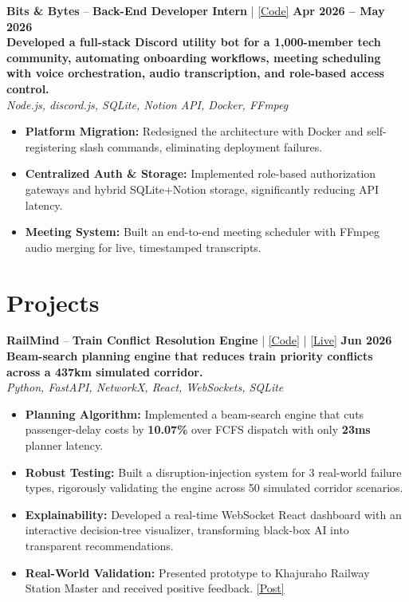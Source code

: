 \documentclass[a4paper,9pt]{extarticle}
\newenvironment{cvlist}{%
  \begin{itemize}[nosep, leftmargin=1.2em, itemsep=0.5pt, topsep=1pt, label=\textbullet, after=\vspace{2pt}]
}{%
  \end{itemize}
}
\begin{document}
\noindent\textbf{Bits \& Bytes} -- \textbf{Back-End Developer Intern} | \href{https://github.com/Prakharrdev/bitsnbytes-discord-utility}{\small [Code]} \hfill \textbf{Apr 2026 -- May 2026}\\[1pt]
\textbf{Developed a full-stack Discord utility bot for a 1,000-member tech community, automating onboarding workflows, meeting scheduling with voice orchestration, audio transcription, and role-based access control.}\\[1pt]\noindent\textit{Node.js, discord.js, SQLite, Notion API, Docker, FFmpeg}
\begin{cvlist}
  \item \textbf{Platform Migration:} Redesigned the architecture with Docker and self-registering slash commands, eliminating deployment failures.
  \item \textbf{Centralized Auth \& Storage:} Implemented role-based authorization gateways and hybrid SQLite+Notion storage, significantly reducing API latency.
  \item \textbf{Meeting System:} Built an end-to-end meeting scheduler with FFmpeg audio merging for live, timestamped transcripts.
\end{cvlist}

\section{Projects}

\noindent\textbf{RailMind} -- \textbf{Train Conflict Resolution Engine} | \href{https://github.com/Prakharrdev/railmind}{\small [Code]} | \href{https://railmind.perkkk.dev}{\small [Live]} \hfill \textbf{Jun 2026}\\[1pt]
\textbf{Beam-search planning engine that reduces train priority conflicts across a 437km simulated corridor.}\\[1pt]
\noindent\textit{Python, FastAPI, NetworkX, React, WebSockets, SQLite}
\begin{cvlist}
  \item \textbf{Planning Algorithm:} Implemented a beam-search engine that cuts passenger-delay costs by \textbf{10.07\%} over FCFS dispatch with only \textbf{23ms} planner latency.
  \item \textbf{Robust Testing:} Built a disruption-injection system for 3 real-world failure types, rigorously validating the engine across 50 simulated corridor scenarios.
  \item \textbf{Explainability:} Developed a real-time WebSocket React dashboard with an interactive decision-tree visualizer, transforming black-box AI into transparent recommendations.
  \item \textbf{Real-World Validation:} Presented prototype to Khajuraho Railway Station Master and received positive feedback. \href{https://x.com/prakharbuildss/status/2074232602010263635}{\small [Post]}
\end{cvlist}
\end{document}
